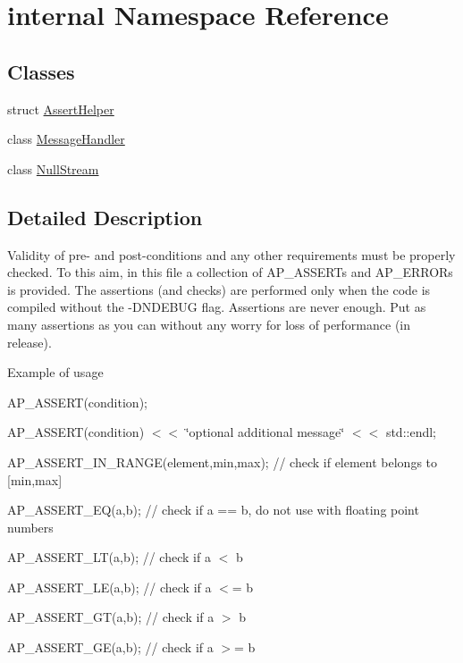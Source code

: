 \hypertarget{namespaceinternal}{}\section{internal Namespace Reference}
\label{namespaceinternal}
\subsection*{Classes}
\begin{DoxyCompactItemize}
\item 
struct \hyperlink{structinternal_1_1AssertHelper}{Assert\+Helper}
\item 
class \hyperlink{classinternal_1_1MessageHandler}{Message\+Handler}
\item 
class \hyperlink{classinternal_1_1NullStream}{Null\+Stream}
\end{DoxyCompactItemize}


\subsection{Detailed Description}
Validity of pre-\/ and post-\/conditions and any other requirements must be properly checked. To this aim, in this file a collection of A\+P\+\_\+\+A\+S\+S\+E\+R\+Ts and A\+P\+\_\+\+E\+R\+R\+O\+Rs is provided. The assertions (and checks) are performed only when the code is compiled without the -\/\+D\+N\+D\+E\+B\+UG flag. Assertions are never enough. Put as many assertions as you can without any worry for loss of performance (in release).

Example of usage

A\+P\+\_\+\+A\+S\+S\+E\+R\+T(condition);

A\+P\+\_\+\+A\+S\+S\+E\+R\+T(condition) $<$$<$ \char`\"{}optional additional message\char`\"{} $<$$<$ std\+::endl;

A\+P\+\_\+\+A\+S\+S\+E\+R\+T\+\_\+\+I\+N\+\_\+\+R\+A\+N\+G\+E(element,min,max); // check if element belongs to \mbox{[}min,max\mbox{]}

A\+P\+\_\+\+A\+S\+S\+E\+R\+T\+\_\+\+E\+Q(a,b); // check if a == b, do not use with floating point numbers

A\+P\+\_\+\+A\+S\+S\+E\+R\+T\+\_\+\+L\+T(a,b); // check if a $<$ b

A\+P\+\_\+\+A\+S\+S\+E\+R\+T\+\_\+\+L\+E(a,b); // check if a $<$= b

A\+P\+\_\+\+A\+S\+S\+E\+R\+T\+\_\+\+G\+T(a,b); // check if a $>$ b

A\+P\+\_\+\+A\+S\+S\+E\+R\+T\+\_\+\+G\+E(a,b); // check if a $>$= b

